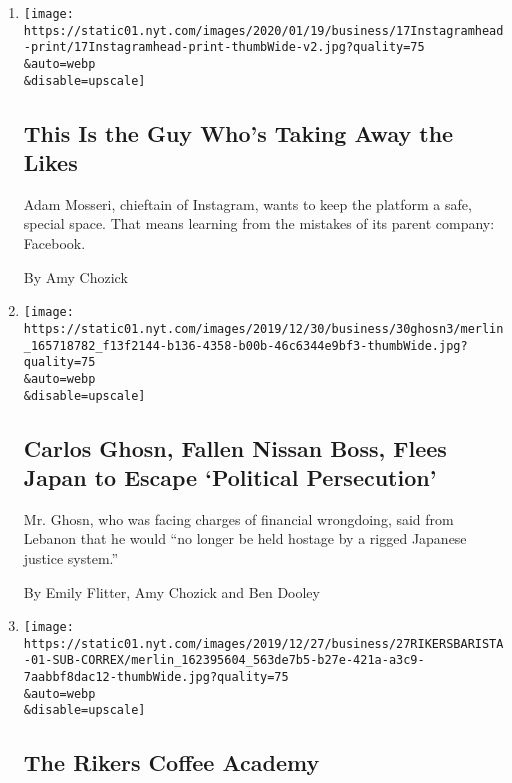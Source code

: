 \begin{enumerate}
\def\labelenumi{\arabic{enumi}.}
\item
  \href{/2020/01/17/business/instagram-likes.html}{}

  \texttt{[image: https://static01.nyt.com/images/2020/01/19/business/17Instagramhead-print/17Instagramhead-print-thumbWide-v2.jpg?quality=75\\\&auto=webp\\\&disable=upscale]}

  \hypertarget{this-is-the-guy-whos-taking-away-the-likes}{%
  \subsection{This Is the Guy Who's Taking Away the
  Likes}\label{this-is-the-guy-whos-taking-away-the-likes}}

  Adam Mosseri, chieftain of Instagram, wants to keep the platform a
  safe, special space. That means learning from the mistakes of its
  parent company: Facebook.

  By Amy Chozick
\item
  \href{/2019/12/30/business/carlos-ghosn-left-japan.html}{}

  \texttt{[image: https://static01.nyt.com/images/2019/12/30/business/30ghosn3/merlin\_165718782\_f13f2144-b136-4358-b00b-46c6344e9bf3-thumbWide.jpg?quality=75\\\&auto=webp\\\&disable=upscale]}

  \hypertarget{carlos-ghosn-fallen-nissan-boss-flees-japan-to-escape-political-persecution}{%
  \subsection{Carlos Ghosn, Fallen Nissan Boss, Flees Japan to Escape
  `Political
  Persecution'}\label{carlos-ghosn-fallen-nissan-boss-flees-japan-to-escape-political-persecution}}

  Mr. Ghosn, who was facing charges of financial wrongdoing, said from
  Lebanon that he would ``no longer be held hostage by a rigged Japanese
  justice system.''

  By Emily Flitter, Amy Chozick and Ben Dooley
\item
  \href{/2019/12/27/business/rikers-island-baristas.html}{}

  \texttt{[image: https://static01.nyt.com/images/2019/12/27/business/27RIKERSBARISTA-01-SUB-CORREX/merlin\_162395604\_563de7b5-b27e-421a-a3c9-7aabbf8dac12-thumbWide.jpg?quality=75\\\&auto=webp\\\&disable=upscale]}

  \hypertarget{the-rikers-coffee-academy}{%
  \subsection{The Rikers Coffee
  Academy}\label{the-rikers-coffee-academy}}


\end{enumerate}
